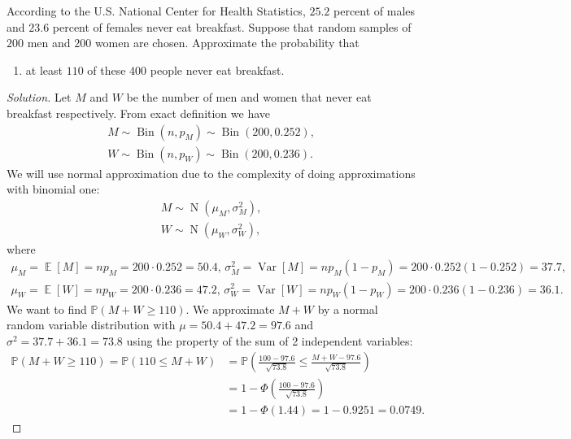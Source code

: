 \documentclass{article}[12pt]
\newenvironment{solution}
  {\renewcommand\qedsymbol{$\blacksquare$}\begin{proof}[Solution]}
  {\end{proof}}
\newenvironment{problem}[1]
  {\renewcommand\theinnercustomprblm{#1}\innercustomprblm}
  {\endinnercustomprblm}
\DeclareMathOperator{\Norm}{N}
\DeclareMathOperator{\Var}{Var}
\DeclareMathOperator{\Bin}{Bin}
\DeclareMathOperator{\E}{\mathbb{E}}
\renewcommand{\P}{\mathbb{P}}
\begin{document}
\begin{problem}{6.31(a)}\normalfont
According to the U.S. National Center for Health Statistics, $25.2$ percent of males and $23.6$ percent of females never eat breakfast. 
Suppose that random samples of $200$ men and $200$ women are chosen.
Approximate the probability that
\begin{enumerate}[label=(\alph*)]
    \item at least $110$ of these $400$ people never eat breakfast.
\end{enumerate}
\end{problem}
\begin{solution}
Let $M$ and $W$ be the number of men and women that never eat breakfast respectively.
From exact definition we have
\begin{gather*}
    M\sim\Bin(n, p_{M})\sim\Bin(200, 0.252),
    \\
    W\sim\Bin(n, p_{W})\sim\Bin(200, 0.236).
\end{gather*}
We will use normal approximation due to the complexity of doing approximations with binomial one:
\begin{gather*}
    M\sim\Norm(\mu_{M}, \sigma_{M}^{2}),
    \\
    W\sim\Norm(\mu_{W}, \sigma_{W}^{2}),
\end{gather*}
where
\begin{gather*}
    \mu_{M} = \E[M] = np_{M} = 200\cdot 0.252 = 50.4,\,\sigma_{M}^{2} = \Var[M] = np_{M}(1 - p_{M}) = 200\cdot 0.252(1 - 0.252) = 37.7,
    \\
    \mu_{W} = \E[W] = np_{W} = 200\cdot 0.236 = 47.2,\,\sigma_{W}^{2} = \Var[W] = np_{W}(1 - p_{W}) = 200\cdot 0.236(1 - 0.236) = 36.1.
\end{gather*}
We want to find $\P(M + W \geqslant 110)$.
We approximate $M + W$ by a normal random variable distribution with $\mu = 50.4 + 47.2 = 97.6$ and $\sigma^{2} = 37.7 + 36.1 = 73.8$ using the property of the sum of 2 independent variables:
\begin{align*}
    \P(M + W \geqslant 110) = \P(110 \leqslant M + W) &= \P\left(\frac{100 - 97.6}{\sqrt{73.8}} \leqslant \frac{M + W - 97.6}{\sqrt{73.8}}\right)
    \\
    &= 1- \Phi\left(\frac{100 - 97.6}{\sqrt{73.8}}\right)
    \\
    &= 1 - \Phi(1.44) = 1 - 0.9251 = 0.0749.
\end{align*}
\end{solution}
\end{document}
